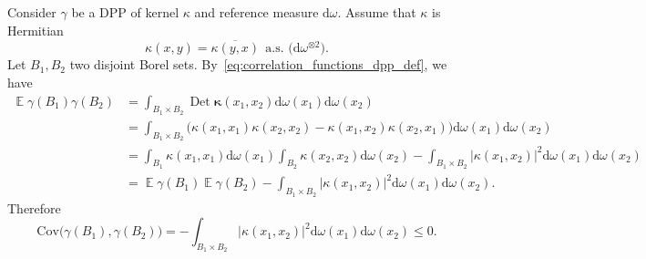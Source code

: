 \documentclass[twoside,11pt]{book}
\numberwithin{theorem}{chapter}
\numberwithin{definition}{chapter}
\numberwithin{proposition}{chapter}
\numberwithin{corollary}{chapter}
\numberwithin{example}{chapter}
\numberwithin{lemma}{chapter}
\numberwithin{assumption}{chapter}
\DeclareMathOperator{\Det}{Det}
\DeclareMathOperator{\EX}{\mathbb{E}}
\begin{document}
Consider $\gamma$ be a DPP of kernel $\kappa$ and reference measure $\mathrm{d}\omega$. Assume that $\kappa$ is Hermitian
\begin{equation} \label{eq:hermitian_condition_kappa}
\kappa(x,y) = \overline{\kappa(y,x)} \:\: \text{a.s. (} \mathrm{d}\omega^{\otimes 2} \text{)}.  
\end{equation}
Let $B_{1}, B_{2}$ two disjoint Borel sets. By~\ref{eq:correlation_functions_dpp_def}, we have
\begin{align}\label{eq:cov_DPP_gamma_B_1_B_2_dev}
\EX \gamma(B_{1}) \gamma(B_{2}) & = \int_{B_{1} \times B_{2}} \Det \bm{\kappa}(x_{1},x_{2}) \mathrm{d}\omega(x_1) \mathrm{d}\omega(x_2) \nonumber\\
& = \int_{B_{1} \times B_{2}} \Big( \kappa(x_{1},x_{1}) \kappa(x_{2},x_{2}) - \kappa(x_{1},x_{2}) \kappa(x_{2},x_{1}) \Big) \mathrm{d}\omega(x_1) \mathrm{d}\omega(x_2)  \nonumber\\
& = \int_{B_{1}} \kappa(x_{1},x_{1}) \mathrm{d}\omega(x_1) \int_{B_{2}} \kappa(x_{2},x_{2}) \mathrm{d}\omega(x_2) - \int_{B_{1} \times B_{2}} |\kappa(x_{1},x_{2})|^{2} \mathrm{d}\omega(x_1) \mathrm{d}\omega(x_2)  \nonumber\\
& = \EX \gamma(B_{1}) \EX \gamma(B_{2}) - \int_{B_{1} \times B_{2}} |\kappa(x_{1},x_{2})|^{2} \mathrm{d}\omega(x_1) \mathrm{d}\omega(x_2). 
\end{align}
Therefore
\begin{equation} \label{eq:cov_DPP_gamma_B_1_B_2}
\mathrm{Cov} \Big(\gamma(B_{1}), \gamma(B_{2}) \Big)  =  - \int_{B_{1} \times B_{2}} |\kappa(x_{1},x_{2})|^{2} \mathrm{d}\omega(x_1) \mathrm{d}\omega(x_2) \leq 0.
\end{equation}
\end{document}
